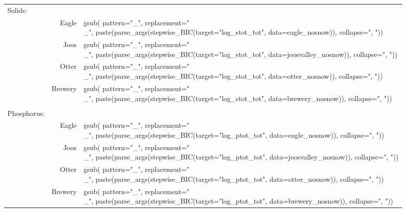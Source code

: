 \documentclass[12pt]{article}
\begin{document}
\begin{table}[h]
    \begin{center}
    \begin{tabular}{lrl}
        Solids: & & \\
        & Eagle & \Sexpr{ gsub( pattern="_", replacement="\\_", paste(parse_args(stepwise_BIC(target="log_stot_tot", data=eagle_nosnow)), collapse=", ")) }\\
        & Joos & \Sexpr{ gsub( pattern="_", replacement="\\_", paste(parse_args(stepwise_BIC(target="log_stot_tot", data=joosvalley_nosnow)), collapse=", ")) }\\
        & Otter & \Sexpr{ gsub( pattern="_", replacement="\\_", paste(parse_args(stepwise_BIC(target="log_stot_tot", data=otter_nosnow)), collapse=", ")) }\\
        & Brewery & \Sexpr{ gsub( pattern="_", replacement="\\_", paste(parse_args(stepwise_BIC(target="log_stot_tot", data=brewery_nosnow)), collapse=", ")) }\\
        \hline \\
        Phosphorus: & & \\
        & Eagle & \Sexpr{ gsub( pattern="_", replacement="\\_", paste(parse_args(stepwise_BIC(target="log_ptot_tot", data=eagle_nosnow)), collapse=", ")) }\\
        & Joos & \Sexpr{ gsub( pattern="_", replacement="\\_", paste(parse_args(stepwise_BIC(target="log_ptot_tot", data=joosvalley_nosnow)), collapse=", ")) }\\
        & Otter & \Sexpr{ gsub( pattern="_", replacement="\\_", paste(parse_args(stepwise_BIC(target="log_ptot_tot", data=otter_nosnow)), collapse=", ")) }\\
        & Brewery & \Sexpr{ gsub( pattern="_", replacement="\\_", paste(parse_args(stepwise_BIC(target="log_ptot_tot", data=brewery_nosnow)), collapse=", ")) }\\
    \end{tabular}
    \end{center}
\end{table}
\end{document}
